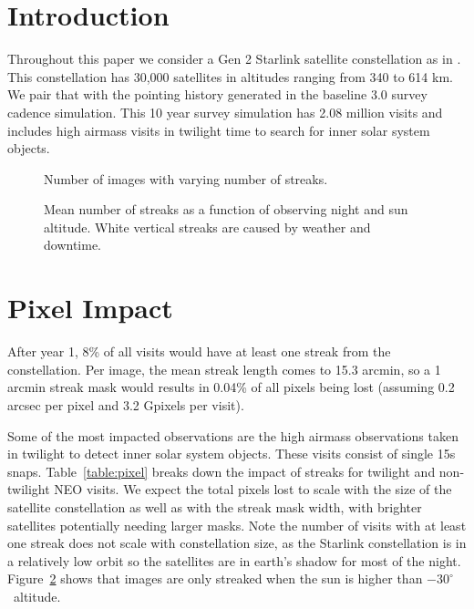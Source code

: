 \section{Introduction}

Throughout this paper we consider a Gen 2 Starlink satellite constellation as in \citet{Hu2022}. This constellation has 30,000 satellites in altitudes ranging from 340 to 614 km. We pair that with the pointing history generated in the baseline 3.0 survey cadence simulation. This 10 year survey simulation has 2.08 million visits and includes high airmass visits in twilight time to search for inner solar system objects.


\begin{figure}
\caption{Number of images with varying number of streaks. \label{fig:streak_hist_1}}
\end{figure}



\begin{figure}
\caption{Mean number of streaks as a function of observing night and sun altitude. White vertical streaks are caused by weather and downtime. \label{fig:streak_hist_2}}
\end{figure}

\section{Pixel Impact}

After year 1, 8\% of all visits would have at least one streak from the constellation. Per image, the mean streak length comes to 15.3 arcmin, so a 1 arcmin streak mask would results in 0.04\% of all pixels being lost (assuming 0.2 arcsec per pixel and 3.2 Gpixels per visit).

Some of the most impacted observations are the high airmass observations taken in twilight to detect inner solar system objects. These visits consist of single 15s snaps. Table~\ref{table:pixel} breaks down the impact of streaks for twilight and non-twilight NEO visits. We expect the total pixels lost to scale with the size of the satellite constellation as well as with the streak mask width, with brighter satellites potentially needing larger masks. Note the number of visits with at least one streak does not scale with constellation size, as the Starlink constellation is in a relatively low orbit so the satellites are in earth's shadow for most of the night. Figure~\ref{fig:streak_hist_2} shows that images are only streaked when the sun is higher than $-30^\circ$\ altitude.

